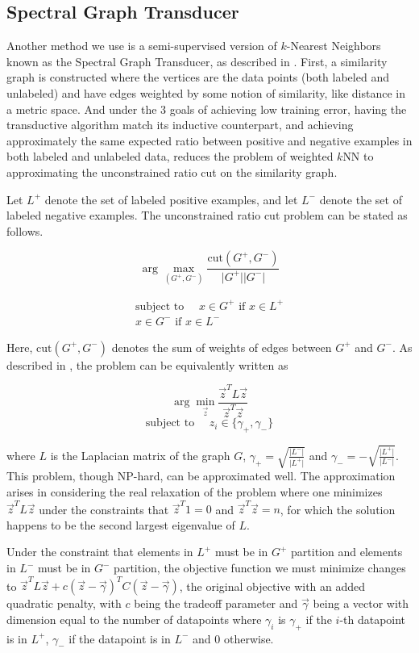 \documentclass[11pt]{article}
\begin{document}
\subsection{Spectral Graph Transducer}
Another method we use is a semi-supervised version of $k$-Nearest Neighbors known as the Spectral Graph Transducer, as described in \cite{joachims2003transductive}. First, a similarity
graph is constructed where the vertices are the data points (both labeled
and unlabeled) and have edges weighted by some notion of similarity, like
distance in a metric space.
And under the 3 goals of achieving low training error, having the 
transductive algorithm match its inductive counterpart, and achieving
approximately the same expected ratio between positive and negative examples 
in both labeled and unlabeled data, \cite{joachims2003transductive}
reduces the problem of weighted $k$NN to approximating the unconstrained
ratio cut on the similarity graph.

Let $L^+$ denote the set of labeled positive examples, and let
$L^-$ denote the set of labeled negative examples.
The unconstrained ratio cut problem can be stated as follows.

\[\arg\max_{(G^+, G^-)}\frac{\mathrm{cut}(G^+,
G^-)}{\lvert G^+\rvert\lvert G^-\rvert}\]

\begin{align*}
\text{subject to }\quad x\in G^+\text{ if }x\in L^+\\
x\in G^-\text{ if }x\in L^-
\end{align*}

Here, $\mathrm{cut}(G^+, G^-)$ denotes the sum of weights of
edges between $G^+$ and $G^-$. As described in \cite{dhillon2001co}, the problem can be equivalently written as

\[\arg\min_{\vec{z}}\frac{\vec{z}^T L\vec{z}}{\vec{z}^T\vec{z}}\]
\[\text{subject to }\quad z_i\in\{\gamma_+,\gamma_-\}\]

where $L$ is the Laplacian matrix of the graph $G$,
$\gamma_+=\sqrt{\frac{\lvert L^-\rvert}{\lvert L^+\rvert}}$
and $\gamma_-=-\sqrt{\frac{\lvert L^+\rvert}{\lvert L^-\rvert}}$.
This problem, though NP-hard, can
be approximated well. The approximation arises in considering the real relaxation of the problem where one minimizes $\vec{z}^TL\vec{z}$
under the constraints that $\vec{z}^T1=0$ and $\vec{z}^T\vec{z}=n$,
for which the solution happens to be the second largest eigenvalue of
$L$.

Under the constraint that elements in $L^+$ must be in $G^+$
partition and elements in $L^-$ must be in $G^-$ partition,
the objective function we must minimize changes to
$\vec{z}^TL\vec{z}+c(\vec{z}-\vec{\gamma})^TC(\vec{z}-\vec{\gamma})$,
the original objective with an added quadratic penalty, with $c$
being the tradeoff parameter and $\vec{\gamma}$ being a vector
with dimension equal to the number of datapoints where $\gamma_i$
is $\gamma_+$ if the $i$-th datapoint is in $L^+$, $\gamma_-$
if the datapoint is in $L^-$ and 0 otherwise.
\end{document}
